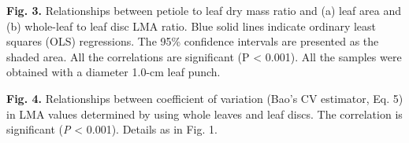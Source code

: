\documentclass[
  12pt,
  a4paper,
,tablecaptionabove
]{scrartcl}
\providecommand{\DIFdelbegin}{} %
\providecommand{\DIFdelend}{} %
\begin{document}
\DIFdelbegin %


\DIFdelend \textbf{Fig. 3.}
Relationships between petiole to leaf dry mass ratio and (a) leaf area and (b) whole-leaf to leaf disc LMA ratio.
Blue solid lines indicate ordinary least squares (OLS) regressions.
The 95\% confidence intervals are presented as the shaded area.
All the correlations are significant (P \textless{} 0.001).
All the samples were obtained with a diameter 1.0-cm leaf punch.

\DIFdelbegin %


\DIFdelend \textbf{Fig. 4.}
Relationships between coefficient of variation (Bao's CV estimator, Eq. 5) in LMA values determined by using whole leaves and leaf discs.
The correlation is significant (\emph{P} \textless{} 0.001).
Details as in Fig. 1.
\DIFdelbegin %

\DIFdelend 
\end{document}
